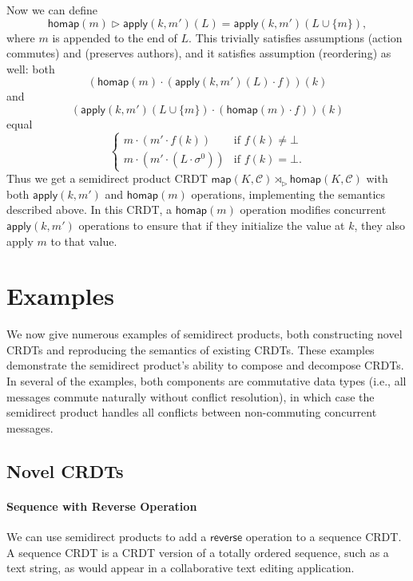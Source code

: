\documentclass[acmsmall,nonacm]{acmart}
\newcommand{\mc}[1]{\ensuremath{\mathcal{#1}}}
\newcommand{\msf}[1]{\ensuremath{\mathsf{#1}}}
\newcommand{\act}{\triangleright}
\theoremstyle{plain}
\theoremstyle{definition}
\begin{document}
Now we can define
\[
\msf{homap}(m) \act \msf{apply}(k, m')(L) = \msf{apply}(k, m')(L \cup \{m\}),
\]
where $m$ is appended to the end of $L$.  This trivially satisfies assumptions (action commutes) and (preserves authors), and it satisfies assumption (reordering) as well: both
\[
\left(\msf{homap}(m) \cdot (\msf{apply}(k, m')(L) \cdot f)\right)(k)
\]
and
\[
\left(\msf{apply}(k, m')(L \cup \{m\}) \cdot (\msf{homap}(m) \cdot f)\right)(k)
\]
equal
\[
\begin{cases} m \cdot (m' \cdot f(k)) &\mbox{if $f(k) \neq \bot$} \\ m \cdot (m' \cdot (L \cdot \sigma^0)) &\mbox{if $f(k) = \bot$.} \end{cases}
\]
Thus we get a semidirect product CRDT $\msf{map}(K, \mc{C}) \rtimes_\act \msf{homap}(K, \mc{C})$ with both $\msf{apply}(k, m')$ and $\msf{homap}(m)$ operations, implementing the semantics described above.  In this CRDT, a $\msf{homap}(m)$ operation modifies concurrent $\msf{apply}(k, m')$ operations to ensure that if they initialize the value at $k$, they also apply $m$ to that value.




\section{Examples}
\label{sec:examples}
We now give numerous examples of semidirect products, both constructing novel CRDTs and reproducing the semantics of existing CRDTs.  These examples demonstrate the semidirect product's ability to compose and decompose CRDTs.  In several of the examples, both components are commutative data types (i.e., all messages commute naturally without conflict resolution), in which case the semidirect product handles all conflicts between non-commuting concurrent messages.





\subsection{Novel CRDTs}
\paragraph{Sequence with Reverse Operation}
We can use semidirect products to add a $\msf{reverse}$ operation to a sequence CRDT.  A sequence CRDT is a CRDT version of a totally ordered sequence, such as a text string, as would appear in a collaborative text editing application.
\end{document}
